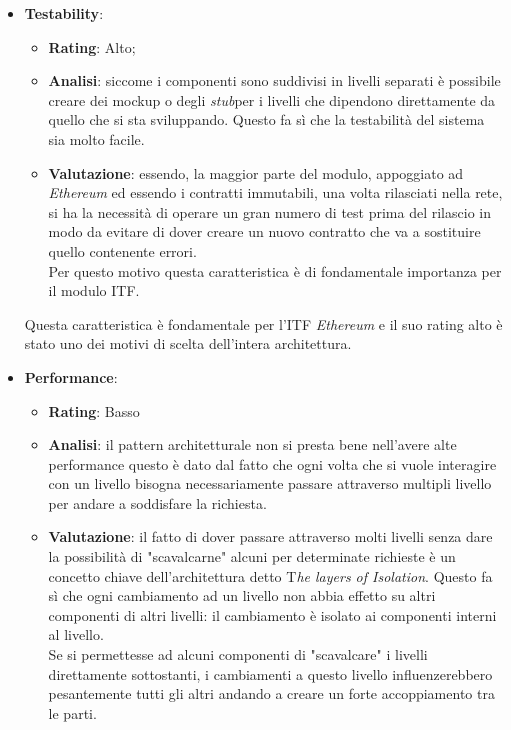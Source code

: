\begin{itemize}
\begin{itemize}
	\end{itemize}
	\item \textbf{Testability}:
	\begin{itemize}
		\item \textbf{Rating}: Alto;
		\item \textbf{Analisi}: siccome i componenti sono suddivisi in livelli separati è possibile creare dei mockup o degli \emph{\gls{stub}}\glsfirstoccur per i livelli che dipendono direttamente da quello che si sta sviluppando. Questo fa sì che la testabilità del sistema sia molto facile\cite{3tierArch}\cite{3tierArch2}.\\
		\item \textbf{Valutazione}: essendo, la maggior parte del modulo, appoggiato ad \textit{Ethereum} ed essendo i contratti immutabili, una volta rilasciati nella rete, si ha la necessità di operare un gran numero di test prima del rilascio in modo da evitare di dover creare un nuovo contratto che va a sostituire quello contenente errori.\\
		Per questo motivo questa caratteristica è di fondamentale importanza per il modulo \gls{ITF}.		
	\end{itemize}
	Questa caratteristica è fondamentale per l'\gls{ITF} \textit{Ethereum} e il suo rating alto è stato uno dei motivi di scelta dell'intera architettura.
	\item \textbf{Performance}:
	\begin{itemize}
		\item \textbf{Rating}: Basso
		\item \textbf{Analisi}: il pattern architetturale non si presta bene nell'avere alte performance questo è dato dal fatto che ogni volta che si vuole interagire con un livello bisogna necessariamente passare attraverso multipli livello per andare a soddisfare la richiesta\cite{3tierArch}\cite{3tierArch2}.
		\item \textbf{Valutazione}: il fatto di dover passare attraverso molti livelli senza dare la possibilità di "scavalcarne" alcuni per determinate richieste è un concetto chiave dell'architettura detto T\textit{he layers of Isolation}. Questo fa sì che ogni cambiamento ad un livello non abbia effetto su altri componenti di altri livelli: il cambiamento è isolato ai componenti interni al livello.\\
		Se si permettesse ad alcuni componenti di "scavalcare" i livelli direttamente sottostanti, i cambiamenti a questo livello influenzerebbero pesantemente tutti gli altri andando a creare un forte accoppiamento tra le parti.\\

\end{itemize}
\end{itemize}
